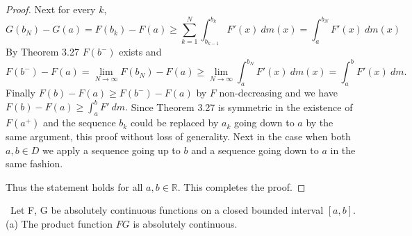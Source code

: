 \documentclass[11pt]{amsart}
\theoremstyle{definition}
\numberwithin{theorem}{section}
\numberwithin{definition}{section}
\numberwithin{equation}{section}
\begin{document}
\begin{proof}
 	  Next for every $k$,
 	  \begin{equation*}
 	  	G(b_N) - G(a) = F(b_k) - F(a) \geq  \sum_{k=1}^N \int_{b_{k-1}}^{b_k} F'(x)\ dm(x) = \int_{a}^{b_N} F'(x)\ dm(x)
 	  \end{equation*}
 	  By Theorem 3.27 $F(b^-)$ exists and 
 	  \begin{equation*}
 	  F(b^-) - F(a)  = \lim_{N\to \infty }F(b_N) - F(a) \geq \lim_{N \to \infty} \int_{a}^{b_N} F'(x)\ dm(x) = \int_a^b F'(x)\ dm.
 	  \end{equation*}
 	  Finally $F(b) - F(a) \geq F(b^-) - F(a)$ by $F$ non-decreasing and we have  $
 	  	F(b) - F(a) \geq \int_a^b F'\ dm.$ Since Theorem 3.27 is symmetric in the existence of $F(a^+)$ and the sequence $b_k$ could be replaced by $a_k$ going down to $a$ by the same argument, this proof without loss of generality. Next in the case when both $a,b \in D$ we apply a sequence going up to $b$ and a sequence going down to $a$ in the same fashion.

 	  Thus the statement holds for all $a,b \in \mathbb{R}.$ This completes the proof.
 \end{proof}
  \medskip {}\ 
 Let F, G be absolutely continuous functions on a closed bounded interval $[a, b]$.
 (a) The product function $FG$ is absolutely continuous.
\end{document}
